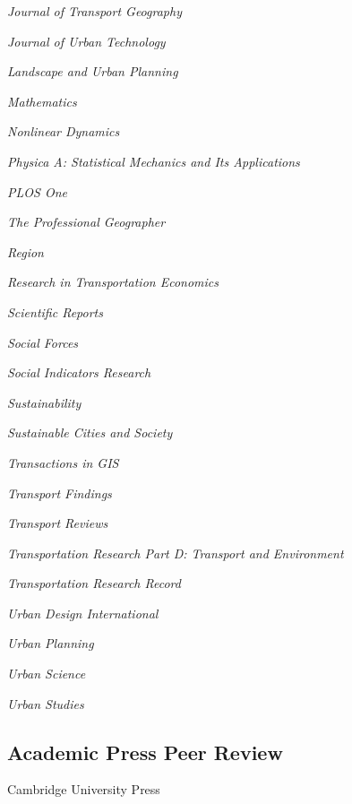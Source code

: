 \documentclass[12pt,letterpaper]{report}
\newcommand{\listitemspace}{0.25em}
\renewenvironment{itemize}
{\begin{list}{}{\setlength{\leftmargin}{0em}
            \setlength{\parskip}{0em}
            \setlength{\itemsep}{\listitemspace}
            \setlength{\parsep}{\listitemspace}}}
{\end{list}}
\begin{document}
\begin{itemize}
        \item \textit{Journal of Transport Geography}
        \item \textit{Journal of Urban Technology}
        \item \textit{Landscape and Urban Planning}
        \item \textit{Mathematics}
        \item \textit{Nonlinear Dynamics}
        \item \textit{Physica A: Statistical Mechanics and Its Applications}
        \item \textit{PLOS One}
        \item \textit{The Professional Geographer}
        \item \textit{Region}
        \item \textit{Research in Transportation Economics}
        \item \textit{Scientific Reports}
        \item \textit{Social Forces}
        \item \textit{Social Indicators Research}
        \item \textit{Sustainability}
        \item \textit{Sustainable Cities and Society}
        \item \textit{Transactions in GIS}
        \item \textit{Transport Findings}
        \item \textit{Transport Reviews}
        \item \textit{Transportation Research Part D: Transport and Environment}
        \item \textit{Transportation Research Record}
        \item \textit{Urban Design International}
        \item \textit{Urban Planning}
        \item \textit{Urban Science}
        \item \textit{Urban Studies}

    \end{itemize}

    \subsection*{Academic Press Peer Review}

    \begin{itemize}

        \item Cambridge University Press

    \end{itemize}
\end{document}
